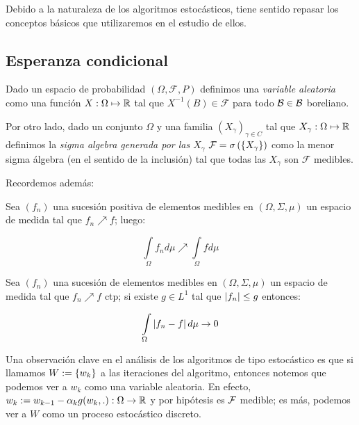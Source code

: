 Debido a la naturaleza de los algoritmos estoc\'asticos, tiene sentido repasar los conceptos b\'asicos que utilizaremos en el estudio de ellos.

\subsection{Esperanza condicional}

Dado un espacio de probabilidad $\left(\Omega, \mathcal{F}, P\right)$ definimos una \textit{variable aleatoria } como una funci\'on $X : \Omega \mapsto {\mathbb{R}}$ tal que $X^{-1}(B) \in \mathcal{F}$ para todo $\mathcal{B} \in \mathcal{B}$ boreliano.

Por otro lado, dado un conjunto $\Omega$ y una familia $\left(X_{\gamma}\right)_{\gamma \in C}$ tal que $X_{\gamma}: \Omega \mapsto {\mathbb{R}}$ definimos la \textit{sigma algebra generada por las $X_\gamma$} $\mathcal{F} = \sigma\left(\left\lbrace X_{\gamma}\right\rbrace\right)$ como la menor sigma \'algebra (en el sentido de la inclusi\'on) tal que todas las $X_{\gamma}$ son $\mathcal{F}$ medibles.

Recordemos adem\'as:

\begin{theorem}
	\label{theorem: Convergencia monotona}
	Sea $(f_n)$ una sucesi\'on positiva de elementos medibles en $(\Omega, \Sigma, \mu)$ un espacio de medida tal que $f_n \nearrow f$; luego:
	
	\begin{equation*}
		\int\limits_{\Omega} {f_n d\mu} \nearrow \int\limits_{\Omega}{f d\mu} 
	\end{equation*} 
\end{theorem}

\begin{theorem}
	\label{theorem: Convergencia dominada}
	Sea $(f_n)$ una sucesi\'on de elementos medibles en $(\Omega, \Sigma, \mu)$ un espacio de medida tal que $f_n \nearrow f$ ctp; si existe $g \in L^1$ tal que $\left\lvert f_n\right\rvert \leq g$ entonces:
	
	\begin{equation*}
	\int\limits_{\Omega} {\left\lvert f_n -f\right\rvert d\mu} \rightarrow 0
	\end{equation*} 
\end{theorem}

\begin{remark}
	Una observaci\'on clave en el an\'alisis de los algoritmos de tipo estoc\'astico es que si llamamos ${W} := \left\lbrace w_k\right\rbrace$ a las iteraciones del algoritmo, entonces notemos que podemos ver a $w_k$ como una variable aleatoria. En efecto, $w_k := w_{k-1} - \alpha_k g(w_k, .) : \Omega \rightarrow {\mathbb{R}}$ y por hip\'otesis es $\mathcal{F}$ medible; es m\'as, podemos ver a $W$ como un proceso estoc\'astico discreto.
\end{remark}

